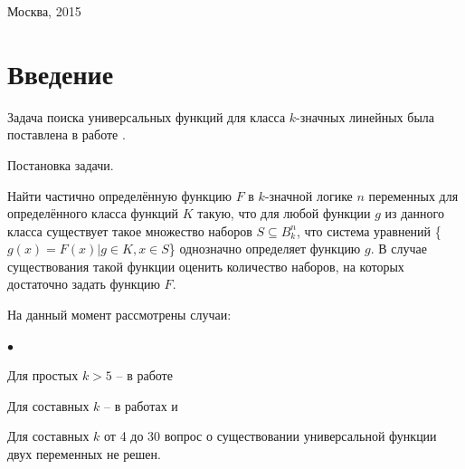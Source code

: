 \documentclass[oneside,final,14pt]{extreport}
\newenvironment{compactlist}{
    \begin{list}{{$\bullet$}}{
      \setlength\partopsep{0pt}
      \setlength\parskip{0pt}
      \setlength\parsep{0pt}
      \setlength\topsep{0pt}
      \setlength\itemsep{0pt}
} }{

 \end{list} 
}
\begin{document}
\vfill

\begin{center}
  Москва, 2015
\end{center}

\thispagestyle{empty}

\clearpage

\tableofcontents


  \chapter*{Введение}

Задача поиска универсальных функций для класса \(k\)-значных линейных была поставлена в работе \cite{k_lin}.

Постановка задачи.

Найти частично определённую функцию \(F\) в \(k\)-значной логике \(n\) переменных 
для определённого класса функций \(K\) такую, что для любой функции \(g\) из данного класса существует такое
множество наборов \(S \subseteq B_k ^n\), что система уравнений \{\(g(x) = F(x) | g \in K, x \in S\)\} однозначно определяет
функцию \(g\). В случае существования такой функции оценить количество наборов, 
на которых достаточно задать функцию \(F\).

На данный момент рассмотрены случаи:
\begin{compactlist}
\item Для простых \(k > 5\) -- в работе \cite{k_lin} 
\item Для составных \(k\) -- в работах \cite{} и \cite{}
\end{compactlist}

Для составных \(k\) от 4 до 30 вопрос о существовании универсальной функции двух переменных не решен.

%
\end{document}
